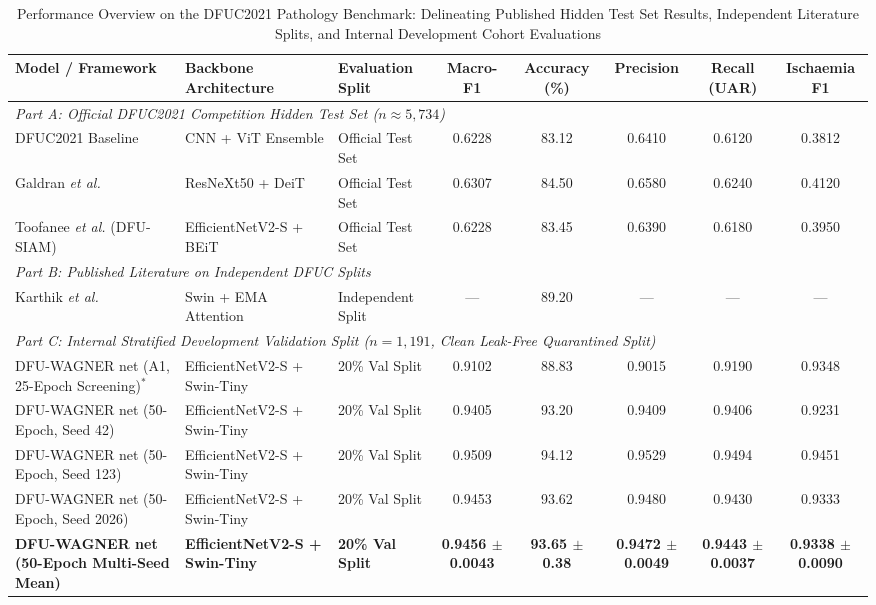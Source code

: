 \documentclass[journal]{IEEEtran}
\begin{document}
\begin{table}[t]
\centering
\caption{Performance Overview on the DFUC2021 Pathology Benchmark: Delineating Published Hidden Test Set Results, Independent Literature Splits, and Internal Development Cohort Evaluations}
\label{tab:dfuc_comparison}
\begin{tabular}{lllccccc}
\toprule
\textbf{Model / Framework} & \textbf{Backbone Architecture} & \textbf{Evaluation Split} & \textbf{Macro-F1} & \textbf{Accuracy (\%)} & \textbf{Precision} & \textbf{Recall (UAR)} & \textbf{Ischaemia F1} \\
\midrule
\multicolumn{8}{l}{\textit{Part A: Official DFUC2021 Competition Hidden Test Set ($n \approx 5,734$)}} \\
DFUC2021 Baseline \cite{cassidy2021diabetic} & CNN + ViT Ensemble & Official Test Set & 0.6228 & 83.12 & 0.6410 & 0.6120 & 0.3812 \\
Galdran \textit{et al.} \cite{galdran2021convolutional} & ResNeXt50 + DeiT & Official Test Set & 0.6307 & 84.50 & 0.6580 & 0.6240 & 0.4120 \\
Toofanee \textit{et al.} (DFU-SIAM) \cite{toofanee2023dfu} & EfficientNetV2-S + BEiT & Official Test Set & 0.6228 & 83.45 & 0.6390 & 0.6180 & 0.3950 \\
\midrule
\multicolumn{8}{l}{\textit{Part B: Published Literature on Independent DFUC Splits}} \\
Karthik \textit{et al.} \cite{karthik2025attention} & Swin + EMA Attention & Independent Split & --- & 89.20 & --- & --- & --- \\
\midrule
\multicolumn{8}{l}{\textit{Part C: Internal Stratified Development Validation Split ($n = 1,191$, Clean Leak-Free Quarantined Split)}} \\
DFU-WAGNER net (A1, 25-Epoch Screening)$^*$ & EfficientNetV2-S + Swin-Tiny & 20\% Val Split & 0.9102 & 88.83 & 0.9015 & 0.9190 & 0.9348 \\
DFU-WAGNER net (50-Epoch, Seed 42) & EfficientNetV2-S + Swin-Tiny & 20\% Val Split & 0.9405 & 93.20 & 0.9409 & 0.9406 & 0.9231 \\
DFU-WAGNER net (50-Epoch, Seed 123) & EfficientNetV2-S + Swin-Tiny & 20\% Val Split & 0.9509 & 94.12 & 0.9529 & 0.9494 & 0.9451 \\
DFU-WAGNER net (50-Epoch, Seed 2026) & EfficientNetV2-S + Swin-Tiny & 20\% Val Split & 0.9453 & 93.62 & 0.9480 & 0.9430 & 0.9333 \\
\midrule
\textbf{DFU-WAGNER net (50-Epoch Multi-Seed Mean)} & \textbf{EfficientNetV2-S + Swin-Tiny} & \textbf{20\% Val Split} & \textbf{0.9456 $\pm$ 0.0043} & \textbf{93.65 $\pm$ 0.38} & \textbf{0.9472 $\pm$ 0.0049} & \textbf{0.9443 $\pm$ 0.0037} & \textbf{0.9338 $\pm$ 0.0090} \\

\end{tabular}
\end{table}
\end{document}
